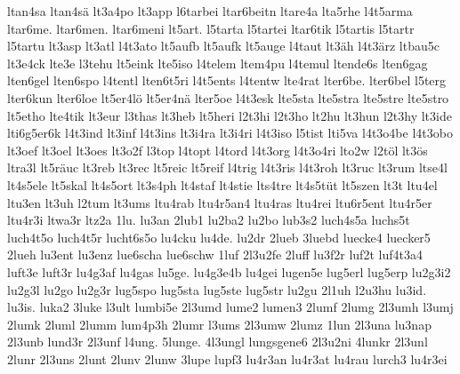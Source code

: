 {    ltan4sa
    ltan4sä
    lt3a4po
    lt3app
    l6tarbei
    ltar6beitn
    ltare4a
    lta5rhe
    l4t5arma
    ltar6me.
    ltar6men.
    ltar6meni
    lt5art.
    l5tarta
    l5tartei
    ltar6tik
    l5tartis
    l5tartr
    l5tartu
    lt3asp
    lt3atl
    l4t3ato
    lt5aufb
    lt5aufk
    lt5auge
    l4taut
    lt3äh
    l4t3ärz
    ltbau5c
    lt3e4ck
    lte3e
    l3tehu
    lt5eink
    lte5iso
    l4telem
    ltem4pu
    l4temul
    ltende6s
    lten6gag
    lten6gel
    lten6spo
    l4tentl
    lten6t5ri
    l4t5ents
    l4tentw
    lte4rat
    lter6be.
    lter6bel
    l5terg
    lter6kun
    lter6loe
    lt5er4lö
    lt5er4nä
    lter5oe
    l4t3esk
    lte5sta
    lte5stra
    lte5stre
    lte5stro
    lt5etho
    lte4tik
    lt3eur
    l3thas
    lt3heb
    lt5heri
    l2t3hi
    l2t3ho
    lt2hu
    lt3hun
    l2t3hy
    lt3ide
    lti6g5er6k
    l4t3ind
    lt3inf
    l4t3ins
    lt3i4ra
    lt3i4ri
    l4t3iso
    l5tist
    lti5va
    l4t3o4be
    l4t3obo
    lt3oef
    lt3oel
    lt3oes
    lt3o2f
    l3top
    l4topt
    l4tord
    l4t3org
    l4t3o4ri
    lto2w
    l2töl
    lt3ös
    ltra3l
    lt5räuc
    lt3reb
    lt3rec
    lt5reic
    lt5reif
    l4trig
    l4t3ris
    l4t3roh
    lt3ruc
    lt3rum
    ltse4l
    lt4s5ele
    lt5skal
    lt4s5ort
    lt3s4ph
    lt4staf
    lt4stie
    lts4tre
    lt4s5tüt
    lt5szen
    lt3t
    ltu4el
    ltu3en
    lt3uh
    l2tum
    lt3ums
    ltu4rab
    ltu4r5an4
    ltu4ras
    ltu4rei
    ltu6r5ent
    ltu4r5er
    ltu4r3i
    ltwa3r
    ltz2a
    1lu.
    lu3an
    2lub1
    lu2ba2
    lu2bo
    lub3s2
    luch4s5a
    luchs5t
    luch4t5o
    luch4t5r
    lucht6s5o
    lu4cku
    lu4de.
    lu2dr
    2lueb
    3luebd
    luecke4
    luecker5
    2lueh
    lu3ent
    lu3enz
    lue6scha
    lue6schw
    1luf
    2l3u2fe
    2luff
    lu3f2r
    luf2t
    luf4t3a4
    luft3e
    luft3r
    lu4g3af
    lu4gas
    lu5ge.
    lu4g3e4b
    lu4gei
    lugen5e
    lug5erl
    lug5erp
    lu2g3i2
    lu2g3l
    lu2go
    lu2g3r
    lug5spo
    lug5sta
    lug5ste
    lug5str
    lu2gu
    2l1uh
    l2u3hu
    lu3id.
    lu3is.
    luka2
    3luke
    l3ult
    lumbi5e
    2l3umd
    lume2
    lumen3
    2lumf
    2lumg
    2l3umh
    l3umj
    2lumk
    2luml
    2lumm
    lum4p3h
    2lumr
    l3ums
    2l3umw
    2lumz
    1lun
    2l3una
    lu3nap
    2l3unb
    lund3r
    2l3unf
    l4ung.
    5lunge.
    4l3ungl
    lungsgene6
    2l3u2ni
    4lunkr
    2l3unl
    2lunr
    2l3uns
    2lunt
    2lunv
    2lunw
    3lupe
    lupf3
    lu4r3an
    lu4r3at
    lu4rau
    lurch3
    lu4r3ei
}
